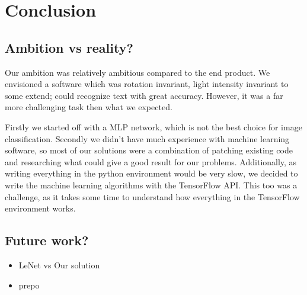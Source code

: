 \documentclass[Report.tex]{subfiles}
\begin{document}
\chapter{Conclusion}
\label{chap:Conclusion}


\section{Ambition vs reality?}
Our ambition was relatively ambitious compared to the end product. We envisioned
a software which was rotation invariant, light intensity invariant to some
extend; could recognize text with great accuracy. However, it was a far more
challenging task then what we expected. \par
Firstly we started off with a MLP network, which is not the best choice for
image classification. Secondly we didn't have much experience with
machine learning software, so most of our solutions were a combination of
patching existing code and researching what could give a good result for
our problems. Additionally, as writing everything in the python environment
would be very slow, we decided to write the machine learning algorithms with the
TensorFlow API. This too was a challenge, as it takes some time to understand
how everything in the TensorFlow environment works.


\section{Future work?}

\begin{itemize}
  \item LeNet vs Our solution
  \item prepo
\end{itemize}
\end{document}
